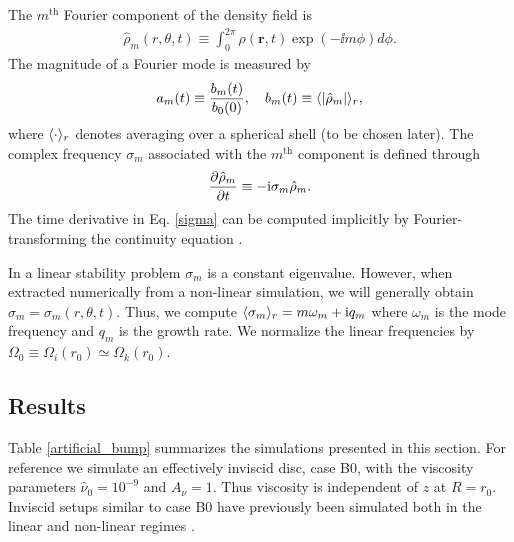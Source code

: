 The $m^\mathrm{th}$ Fourier component of the density field is  
\begin{align}
\hat{\rho}_m(r,\theta,t) \equiv \int_0^{2\pi} \rho(\bm{r},t)\exp{(-\ii
  m\phi)}d\phi. 
\end{align} 
The magnitude of a Fourier mode is measured by 
\begin{align} 
a_m(t)\equiv \frac{b_m(t)}{b_0(0)},\quad b_m(t)\equiv \langle |\hat{\rho}_m| \rangle_r,
\end{align} 
where $\langle \cdot \rangle_r$ denotes averaging over a spherical shell (to be
chosen later). 
The complex frequency $\sigma_m$ associated with the $m^\mathrm{th}$ component 
is defined through 
\begin{align}\label{sigma}
  \frac{\partial\hat{\rho}_m}{\partial t} \equiv -\mathrm{i}\sigma_m\hat{\rho}_m. 
\end{align}
The time derivative in Eq. \ref{sigma} can be computed implicitly by 
Fourier-transforming the continuity equation \citep[as done
  in][]{lin13}. 

In a linear stability problem $\sigma_m$ is a constant eigenvalue. 
However, when extracted numerically from a non-linear simulation, 
we will generally obtain $\sigma_m=\sigma_m(r,\theta,t)$. Thus, we compute 
$\langle \sigma_m \rangle_r = m\omega_m + \mathrm{i} q_m$    
where $\omega_m$ is the mode frequency and $q_m$ is the growth rate.
We normalize the linear frequencies by
$\Omega_0\equiv\Omega_i(r_0)\simeq\Omega_k(r_0)$. 

\subsection{Results}
Table \ref{artificial_bump} summarizes the simulations presented in
this section. 
For reference we simulate an effectively inviscid disc, case B0,
with the viscosity parameters $\hat{\nu}_0=10^{-9}$ and $A_\nu = 1$.  
Thus viscosity is independent of $z$ at $R=r_0$.   
Inviscid setups similar to case B0 have previously been simulated
both in the linear and non-linear regimes  \citep{meheut12, lin13}. 

